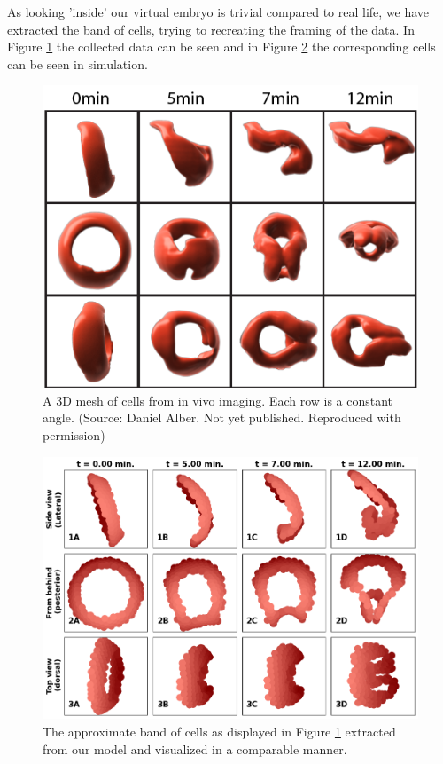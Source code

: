 As looking 'inside' our virtual embryo is trivial compared to real life, we have extracted the band of cells, trying to recreating the framing of the data. In Figure \ref{fig:daniel-cells} the collected data can be seen and in Figure \ref{fig:comparetodaniel} the corresponding cells can be seen in simulation. 
\newpage
\begin{figure}[H]
    \centering
    \includegraphics[width=0.7 \linewidth]{chapters/Results/figures/DanielCut.png}
    \caption{A 3D mesh of cells from in vivo imaging. Each row is a constant angle. (Source: Daniel Alber. Not yet published. Reproduced with permission)}
    \label{fig:daniel-cells}
\end{figure}
\begin{figure}[H]
    \centering
    \includegraphics[width=0.8\linewidth]{chapters/Results/figures/CompareToDaniel.png}
    \caption{The approximate band of cells as displayed in Figure \ref{fig:daniel-cells} extracted from our model and visualized in a comparable manner.}
    \label{fig:comparetodaniel}
\end{figure}

